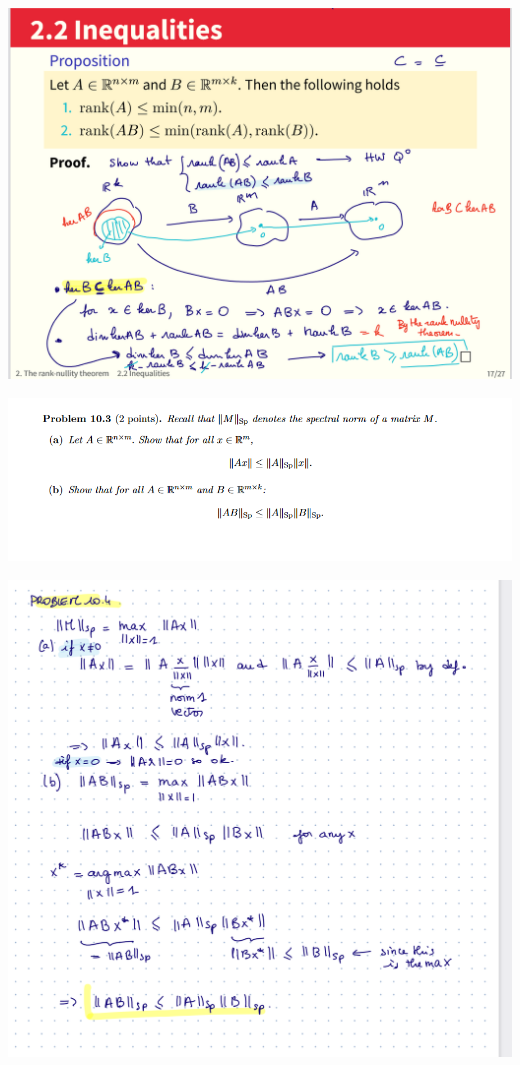 \documentclass[12pt,twoside]{article}
\begin{document}
\includegraphics[scale=.6]{rank nul.png}

\includegraphics[scale=.85]{spectral norm q.png}

\includegraphics[scale=.55]{spectral norm proof.png}
\end{document}
